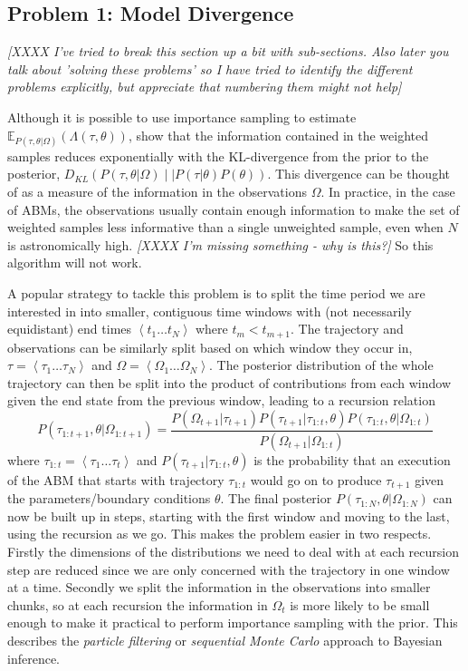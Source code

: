 \documentclass{article}
\begin{document}
\subsection{Problem 1: Model Divergence}

\textit{[XXXX I've tried to break this section up a bit with sub-sections. Also later you talk about 'solving these problems' so I have tried to identify the different problems explicitly, but appreciate that numbering them might not help]}

Although it is possible to use importance sampling to estimate $\mathbb{E}_{P(\tau,\theta|\Omega)}(\Lambda(\tau,\theta))$, \citet{chatterjee2018sample} show that the information contained in the weighted samples reduces exponentially with the KL-divergence from the prior to the posterior, $D_{KL}\left(P(\tau,\theta|\Omega) \mid\mid P(\tau|\theta)P(\theta) \right)$. This divergence can be thought of as a measure of the information in the observations $\Omega$. In practice, in the case of ABMs, the observations usually contain enough information to make the set of weighted samples less informative than a single unweighted sample, even when $N$ is astronomically high. \textit{[XXXX I'm missing something - why is this?]} So this algorithm will not work.

A popular strategy to tackle this problem is to split the time period we are interested in into smaller, contiguous time windows with (not necessarily equidistant) end times $\left<t_1 \dots t_N\right>$ where $t_m < t_{m+1}$. The trajectory and observations can be similarly split based on which window they occur in, $\tau = \left<\tau_1 \dots \tau_N\right>$ and $\Omega = \left<\Omega_1 \dots \Omega_N\right>$. The posterior distribution of the whole trajectory can then be split into the product of contributions from each window given the end state from the previous window, leading to a recursion relation
\begin{equation}
P\left(\tau_{1:t+1}, \theta | \Omega_{1:t+1}\right)
=
\frac{ P(\Omega_{t+1}|\tau_{t+1})
P(\tau_{t+1}|\tau_{1:t},\theta) P\left(\tau_{1:t},\theta| \Omega_{1:t}\right)
}
{	P(\Omega_{t+1}| \Omega_{1:t}) }
\label{bayesrecursion}
\end{equation}
where $\tau_{1:t} = \left<\tau_1 \dots \tau_t\right>$ and $P(\tau_{t+1}|\tau_{1:t},\theta)$ is the probability that an execution of the ABM that starts with trajectory $\tau_{1:t}$ would go on to produce $\tau_{t+1}$ given the parameters/boundary conditions $\theta$. The final posterior $P(\tau_{1:N},\theta|\Omega_{1:N})$ can now be built up in steps, starting with the first window and moving to the last, using the recursion as we go. This makes the problem easier in two respects. Firstly the dimensions of the distributions we need to deal with at each recursion step are reduced since we are only concerned with the trajectory in one window at a time. Secondly we split the information in the observations into smaller chunks, so at each recursion the information in $\Omega_t$ is more likely to be small enough to make it practical to perform importance sampling with the prior. This describes the \textit{particle filtering} or \textit{sequential Monte Carlo} approach to Bayesian inference.
\end{document}
